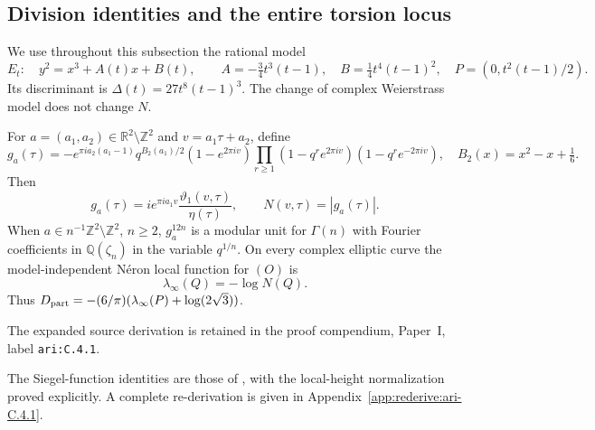 \subsection{Division identities and the entire torsion locus}
We use throughout this subsection the rational model
\[
 E_t:\quad y^2=x^3+A(t)x+B(t),\qquad
 A=-\tfrac34t^3(t-1),\quad B=\tfrac14t^4(t-1)^2,
 \quad P=(0,t^2(t-1)/2).
\]
Its discriminant is $\Delta(t)=27t^8(t-1)^3$.
The change of complex Weierstrass model does not change $N$.

\begin{cited}\label{ari:C.4.1}

For $a=(a_1,a_2)\in\mathbb R^2\setminus\mathbb Z^2$ and
$v=a_1\tau+a_2$, define
\[
 g_a(\tau)=-e^{\pi ia_2(a_1-1)}q^{B_2(a_1)/2}
 (1-e^{2\pi iv})\prod_{r\ge1}
 (1-q^re^{2\pi iv})(1-q^re^{-2\pi iv}),
 \quad B_2(x)=x^2-x+\tfrac16.
\]
Then
\[
 g_a(\tau)=i e^{\pi ia_1v}
       \frac{\vartheta_1(v,\tau)}{\eta(\tau)},\qquad
 N(v,\tau)=|g_a(\tau)|.
\]
When $a\in n^{-1}\mathbb Z^2\setminus\mathbb Z^2$, $n\ge2$,
$g_a^{12n}$ is a modular unit for $\Gamma(n)$ with Fourier coefficients
in $\mathbb Q(\zeta_n)$ in the variable $q^{1/n}$. On every complex
elliptic curve the model-independent Néron local function for $(O)$ is
\[
 \lambda_\infty(Q)=-\log N(Q).
\]
Thus $D_{\rm part}=-(6/\pi)(\lambda_\infty(P)+\log(2\sqrt3))$.
\end{cited}
The expanded source derivation is retained in the proof compendium, Paper~I, label \nolinkurl{ari:C.4.1}.




The Siegel-function identities are those of \citet[Remark~2.2 and Proposition~2.3]{Shin2015}, with the local-height normalization proved explicitly. A complete re-derivation is given in Appendix~\ref{app:rederive:ari-C.4.1}.


